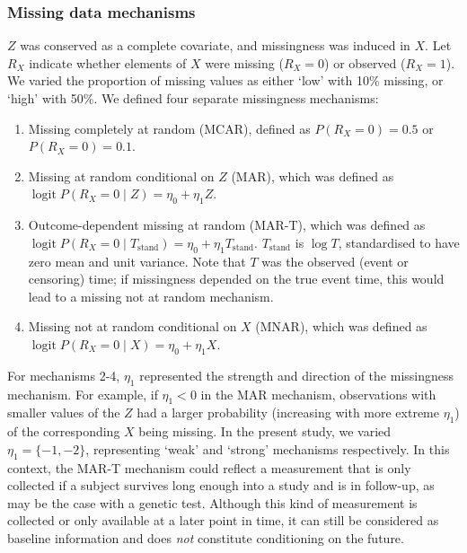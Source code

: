 \documentclass[
  letterpaper,
  DIV=11,
  numbers=noendperiod]{scrreprt}
\DeclareMathOperator{\logit}{logit}
\begin{document}
\hypertarget{missing-data-mechanisms}{%
\subsubsection{Missing data mechanisms}\label{missing-data-mechanisms}}

\(Z\) was conserved as a complete covariate, and missingness was induced
in \(X\). Let \(R_X\) indicate whether elements of \(X\) were missing
(\(R_X = 0\)) or observed (\(R_X = 1\)). We varied the proportion of
missing values as either `low' with 10\% missing, or `high' with 50\%.
We defined four separate missingness mechanisms:

\begin{enumerate}
\def\labelenumi{\arabic{enumi}.}
\item
  Missing completely at random (MCAR), defined as \(P(R_X = 0) = 0.5\)
  or \(P(R_X = 0) = 0.1\).
\item
  Missing at random conditional on \(Z\) (MAR), which was defined as
  \(\logit P(R_X = 0 \mid Z) = \eta_0 + \eta_1 Z\).
\item
  Outcome-dependent missing at random (MAR-T), which was defined as
  \(\logit P(R_X = 0 \mid T_{\text{stand}}) = \eta_0 + \eta_1 T_{\text{stand}}\).
  \(T_{\text{stand}}\) is \(\log T\), standardised to have zero mean and
  unit variance. Note that \(T\) was the observed (event or censoring)
  time; if missingness depended on the true event time, this would lead
  to a missing not at random mechanism.
\item
  Missing not at random conditional on \(X\) (MNAR), which was defined
  as \(\logit P(R_X = 0 \mid X) = \eta_0 + \eta_1 X\).
\end{enumerate}

For mechanisms 2-4, \(\eta_1\) represented the strength and direction of
the missingness mechanism. For example, if \(\eta_1 < 0\) in the MAR
mechanism, observations with smaller values of the \(Z\) had a larger
probability (increasing with more extreme \(\eta_1\)) of the
corresponding \(X\) being missing. In the present study, we varied
\(\eta_1 = \{-1, -2\}\), representing `weak' and `strong' mechanisms
respectively. In this context, the MAR-T mechanism could reflect a
measurement that is only collected if a subject survives long enough
into a study and is in follow-up, as may be the case with a genetic
test. Although this kind of measurement is collected or only available
at a later point in time, it can still be considered as baseline
information and does \emph{not} constitute conditioning on the future.
\end{document}
